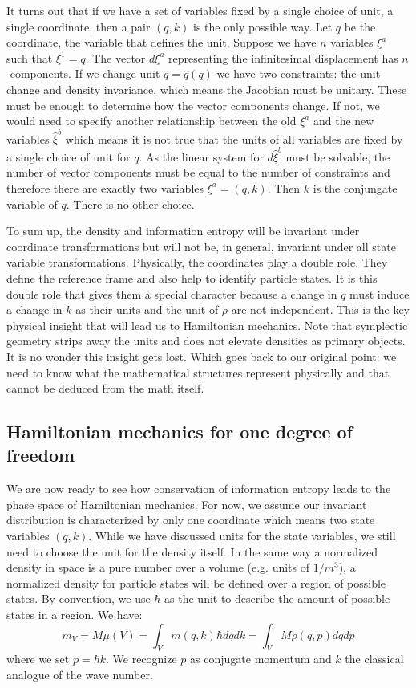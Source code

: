 \documentclass[11pt]{article}
\begin{document}
It turns out that if we have a set of variables fixed by a single choice of unit, a single coordinate, then a pair $(q, k)$ is the only possible way. Let $q$ be the coordinate, the variable that defines the unit. Suppose we have $n$ variables $\xi^a$ such that $\xi^1 = q$. The vector $d\xi^a$ representing the infinitesimal displacement has $n$-components. If we change unit $\hat{q}=\hat{q}(q)$ we have two constraints: the unit change and density invariance, which means the Jacobian must be unitary. These must be enough to determine how the vector components change. If not, we would need to specify another relationship between the old $\xi^a$ and the new variables $\hat{\xi}^b$ which means it is not true that the units of all variables are fixed by a single choice of unit for $q$. As the linear system for $d\hat{\xi}^b$ must be solvable, the number of vector components must be equal to the number of constraints and therefore there are exactly two variables $\xi^a = (q, k)$. Then $k$ is the conjungate variable of $q$. There is no other choice.

To sum up, the density and information entropy will be invariant under coordinate transformations but will not be, in general, invariant under all state variable transformations. Physically, the coordinates play a double role. They define the reference frame and also help to identify particle states. It is this double role that gives them a special character because a change in $q$ must induce a change in $k$ as their units and the unit of $\rho$ are not independent. This is the key physical insight that will lead us to Hamiltonian mechanics. Note that symplectic geometry strips away the units and does not elevate densities as primary objects. It is no wonder this insight gets lost. Which goes back to our original point: we need to know what the mathematical structures represent physically and that cannot be deduced from the math itself.

\subsection*{Hamiltonian mechanics for one degree of freedom}

We are now ready to see how conservation of information entropy leads to the phase space of Hamiltonian mechanics. For now, we assume our invariant distribution is characterized by only one coordinate which means two state variables $(q, k)$. While we have discussed units for the state variables, we still need to choose the unit for the density itself. In the same way a normalized density in space is a pure number over a volume (e.g. units of $1/m^3$), a normalized density for particle states will be defined over a region of possible states. By convention, we use $\hbar$ as the unit to describe the amount of possible states in a region. We have:
\begin{equation}
m_V = M \mu(V) =\int_V m(q, k) \hbar dq dk = \int_V M \rho(q, p) dq dp
\end{equation}
where we set $p=\hbar k$. We recognize $p$ as conjugate momentum and $k$ the classical analogue of the wave number.
\end{document}

